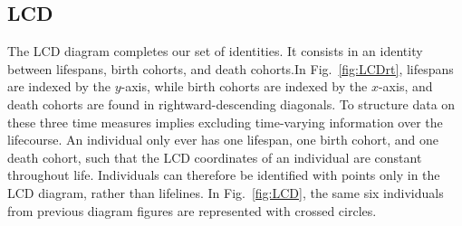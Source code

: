 \documentclass[12pt,oneside,a4paper]{article} %
\newcommand\tgh[1]{\raisebox{-.25\height}{\texttt{[image: Figures/triadtable/triad\#1.pdf]}}}
\begin{document}
\FloatBarrier
\subsection{LCD}%
\FloatBarrier

The LCD diagram completes our set of identities. It consists in an identity
between lifespans, birth cohorts, and death cohorts.In Fig.~\ref{fig:LCDrt}, lifespans are indexed by the
$y$-axis, while birth cohorts are indexed by the $x$-axis, and death cohorts
are found in rightward-descending diagonals. To structure data on these three
time measures implies excluding time-varying information over the lifecourse.
An individual
only ever has one lifespan, one birth cohort, and one death cohort, such that
the LCD coordinates of an individual are constant throughout life.
Individuals can therefore be identified with points only in the LCD diagram,
rather than lifelines. In Fig.~\ref{fig:LCD}, the same six individuals from
previous diagram figures are represented with crossed circles.
\end{document}
